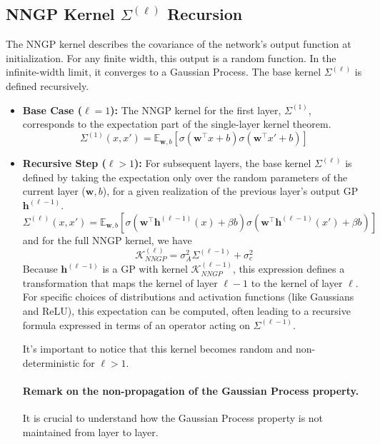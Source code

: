 \documentclass[12pt]{article}
\begin{document}
\subsection{NNGP Kernel \(\Sigma^{(\ell)}\) Recursion}
The NNGP kernel describes the covariance of the network's output function at initialization. For any finite width, this output is a random function. In the infinite-width limit, it converges to a Gaussian Process. The base kernel $\Sigma^{(\ell)}$ is defined recursively.
\begin{itemize}
    \item \textbf{Base Case (\(\ell=1\)):} The NNGP kernel for the first layer, $\Sigma^{(1)}$, corresponds to the expectation part of the single-layer kernel theorem.
    \begin{equation}
        \Sigma^{(1)}(x, x') = \mathbb{E}_{\bm{w},b}\left[\sigma(\bm{w}^\top x + b)\sigma(\bm{w}^\top x' + b)\right]
    \end{equation}
    \item \textbf{Recursive Step (\(\ell > 1\)):} For subsequent layers, the base kernel $\Sigma^{(\ell)}$ is defined by taking the expectation only over the random parameters of the current layer ($\bm{w}, b$), for a given realization of the previous layer's output GP $\bm{h}^{(\ell-1)}$.
    \begin{equation}
        \Sigma^{(\ell)}(x, x') = \mathbb{E}_{\bm{w}, b} \left[ \sigma\left(\bm{w}^\top \bm{h}^{(\ell-1)}(x) + \beta b\right) \sigma\left(\bm{w}^\top \bm{h}^{(\ell-1)}(x') + \beta b\right) \right] 
    \end{equation}
    and for the full NNGP kernel, we have
    \begin{equation}
        \boxed{
        \mathcal{K}_{NNGP}^{(\ell)}=\sigma_A^2\Sigma^{(\ell-1)}+\sigma_c^2
        }
    \end{equation}
    Because $\bm{h}^{(\ell-1)}$ is a GP with kernel $\mathcal{K}_{NNGP}^{(\ell-1)}$, this expression defines a transformation that maps the kernel of layer $\ell-1$ to the kernel of layer $\ell$. For specific choices of distributions and activation functions (like Gaussians and ReLU), this expectation can be computed, often leading to a recursive formula expressed in terms of an operator acting on $\Sigma^{(\ell-1)}$.

    It's important to notice that this kernel becomes random and non-deterministic for $\ell >1$.

    \paragraph{Remark on the non-propagation of the Gaussian Process property.}
    It is crucial to understand how the Gaussian Process property is not maintained from layer to layer. 
    

\end{itemize}
\end{document}
